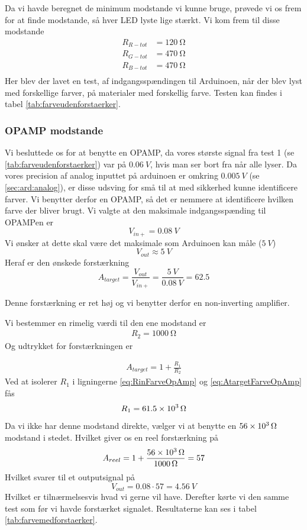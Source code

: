 Da vi havde beregnet de minimum modstande vi kunne bruge, prøvede vi os frem for at finde modstande, så hver LED lyste lige stærkt. Vi kom frem til disse modstande
\begin{align}
	R_{R-tot} &= \SI{120}{\ohm}\\
	R_{G-tot} &= \SI{470}{\ohm}\\
	R_{B-tot} &= \SI{470}{\ohm}\\
\end{align}
Her blev der lavet en test, af indgangsspændingen til Arduinoen, når der blev lyst med forskellige farver, på materialer med forskellig farve. Testen kan findes i tabel \ref{tab:farveudenforstaerker}.

\subsubsection{OPAMP modstande} \label{subs:opampanalog}
Vi besluttede os for at benytte en OPAMP, da vores største signal fra test 1 (se \ref{tab:farveudenforstaerker}) var på $\SI{0.06}{V}$, hvis man ser bort fra når alle lyser. Da vores precision af analog inputtet på arduinoen er omkring $\SI{0.005}{V}$ (se \ref{sec:ard:analog}), er disse udsving for små til at med sikkerhed kunne identificere farver. Vi benytter derfor en OPAMP, så det er nemmere at identificere hvilken farve der bliver brugt.
Vi valgte at den maksimale indgangsspænding til OPAMPen er
\[
	V_{in+} = \SI{0.08}{V}
\]
Vi ønsker at dette skal være det maksimale som Arduinoen kan måle ($\SI{5}{V}$)
\[
	V_{out} \approx \SI{5}{V}
\]
Heraf er den ønskede forstærkning
\[
	A_{target} = \frac{V_{out}}{V_{in+}} = \frac{\SI{5}{V}}{\SI{0.08}{V}}=62.5
\]

Denne forstærkning er ret høj og vi benytter derfor en non-inverting amplifier.

Vi bestemmer en rimelig værdi til den ene modstand er
\begin{align}
	R_{2} = \SI{1000}{\ohm} \label{eq:RinFarveOpAmp}
\end{align}
Og udtrykket for forstærkningen er

\begin{align}
	A_{target} = 1+\frac{R_1}{R_2} \label{eq:AtargetFarveOpAmp}
\end{align}
Ved at isolerer $R_1$ i ligningerne \ref{eq:RinFarveOpAmp} og \ref{eq:AtargetFarveOpAmp} fås
\[
	R_1 = \SI{61.5d3}{\ohm}
\]
Da vi ikke har denne modstand direkte, vælger vi at benytte en $\SI{56d3}{\ohm}$ modstand i stedet. Hvilket giver os en reel forstærkning på
\[
	A_{reel} = 1 + \frac{\SI{56d3}{\ohm}}{\SI{1000}{\ohm}} = 57	
\]
Hvilket svarer til et outputsignal på
\[
	V_{out} = \SI{0.08}\cdot 57 = \SI{4.56}{V}
\]
Hvilket er tilnærmelsesvis hvad vi gerne vil have. Derefter kørte vi den samme test som før vi havde forstærket signalet. Resultaterne kan ses i tabel \ref{tab:farvemedforstaerker}.





